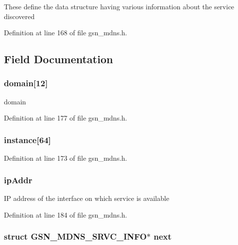 These define the data structure having various information about the service discovered 

Definition at line 168 of file gsn\_\-mdns.h.



\subsection{Field Documentation}
\hypertarget{a00146_a30bc41a1ecdf6122e9ec7ef33f3e0a0d}{
\subsubsection[{domain}]{ {\bf domain}\mbox{[}12\mbox{]}}}
\label{a00146_a30bc41a1ecdf6122e9ec7ef33f3e0a0d}
domain 

Definition at line 177 of file gsn\_\-mdns.h.

\hypertarget{a00146_a5c759bb432f78e05c87ab0fbe8f1a4d7}{
\subsubsection[{instance}]{ {\bf instance}\mbox{[}64\mbox{]}}}
\label{a00146_a5c759bb432f78e05c87ab0fbe8f1a4d7}


Definition at line 173 of file gsn\_\-mdns.h.

\hypertarget{a00146_a48e99cad0feadbd616a0cda7d9628826}{
\subsubsection[{ipAddr}]{ {\bf ipAddr}}}
\label{a00146_a48e99cad0feadbd616a0cda7d9628826}
IP address of the interface on which service is available 

Definition at line 184 of file gsn\_\-mdns.h.

\hypertarget{a00146_a01c0050e80bbd90dcd988cf8e31d7568}{
\subsubsection[{next}]{\setlength{\rightskip}{0pt plus 5cm}struct {\bf GSN\_\-MDNS\_\-SRVC\_\-INFO}$\ast$ {\bf next}}}
\label{a00146_a01c0050e80bbd90dcd988cf8e31d7568}


